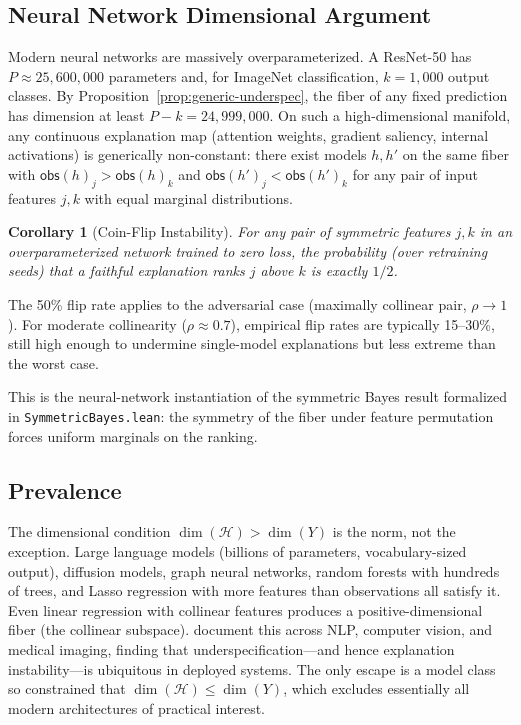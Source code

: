 \documentclass[11pt,a4paper]{article}
\newtheorem{corollary}[theorem]{Corollary}
\newcommand{\sH}{\mathcal{H}}
\begin{document}
\subsection{Neural Network Dimensional Argument}
\label{sec:nn-dimensional}

Modern neural networks are massively overparameterized.  A ResNet-50 has
$P \approx 25{,}600{,}000$ parameters and, for ImageNet classification,
$k = 1{,}000$ output classes.  By Proposition~\ref{prop:generic-underspec},
the fiber of any fixed prediction has dimension at least
$P - k = 24{,}999{,}000$.  On such a high-dimensional manifold, any
continuous explanation map (attention weights, gradient saliency, internal
activations) is generically non-constant: there exist models $h, h'$ on the
same fiber with $\mathsf{obs}(h)_j > \mathsf{obs}(h)_k$ and
$\mathsf{obs}(h')_j < \mathsf{obs}(h')_k$ for any pair of input features
$j, k$ with equal marginal distributions.

\begin{corollary}[Coin-Flip Instability]
\label{cor:coin-flip}
For any pair of symmetric features $j, k$ in an overparameterized network
trained to zero loss, the probability (over retraining seeds) that a
faithful explanation ranks $j$ above $k$ is exactly $1/2$.
\end{corollary}

\noindent
The 50\% flip rate applies to the adversarial case (maximally collinear pair, $\rho \to 1$). For moderate collinearity ($\rho \approx 0.7$), empirical flip rates are typically 15--30\%, still high enough to undermine single-model explanations but less extreme than the worst case.

\noindent
This is the neural-network instantiation of the symmetric Bayes
result formalized in \texttt{Symmetric\-Bayes.lean}: the symmetry
of the fiber under feature permutation forces uniform marginals on
the ranking.

\subsection{Prevalence}
\label{sec:prevalence}

The dimensional condition $\dim(\sH) > \dim(Y)$ is the norm, not the
exception.  Large language models (billions of parameters, vocabulary-sized
output), diffusion models, graph neural networks, random forests with
hundreds of trees, and Lasso regression with more features than observations
all satisfy it.  Even linear regression with collinear features produces a
positive-dimensional fiber (the collinear subspace).
\citet{damour2022underspecification} document this across NLP,
computer vision, and medical imaging, finding that
underspecification---and hence explanation instability---is ubiquitous
in deployed systems.  The only escape is a model class so constrained
that $\dim(\sH) \leq \dim(Y)$, which excludes essentially all modern
architectures of practical interest.
\end{document}
